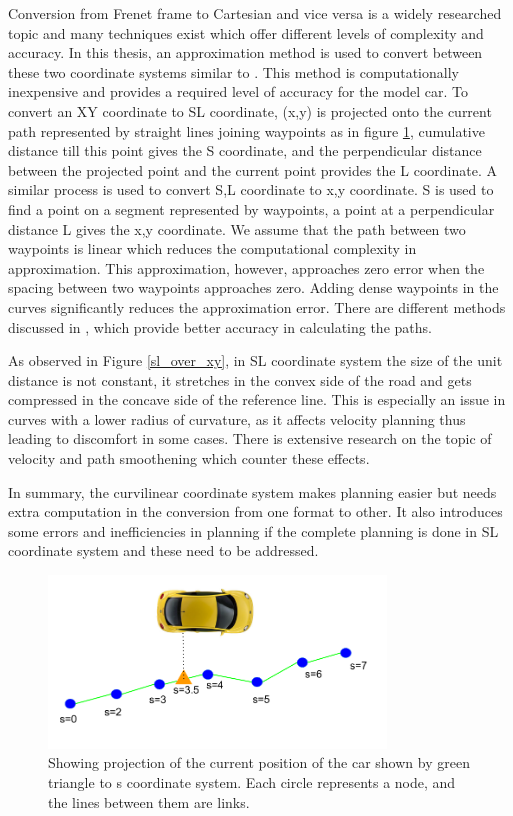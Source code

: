  Conversion from Frenet frame to Cartesian and vice versa is a widely researched topic and many techniques exist which offer different levels of complexity and accuracy. In this thesis, an approximation method is used to convert between these two coordinate systems similar to \cite{volvo_reactive_traj}. This method is computationally inexpensive and provides a required level of accuracy for the model car. To convert an XY coordinate to SL coordinate, (x,y) is projected onto the current path represented by straight lines joining waypoints as in figure \ref{xy_sl_conversion}, cumulative distance till this point gives the S coordinate, and the perpendicular distance between the projected point and the current point provides the L coordinate. A similar process is used to convert S,L coordinate to x,y coordinate. S is used to find a point on a segment represented by waypoints, a point at a perpendicular distance L gives the x,y coordinate. We assume that the path between two waypoints is linear which reduces the computational complexity in approximation. This approximation, however, approaches zero error when the spacing between two waypoints approaches zero. Adding dense waypoints in the curves significantly reduces the approximation error. There are different methods discussed in \cite{lengthparameterized}, \cite{Wangrobustand} which provide better accuracy in calculating the paths. 

As observed in Figure \ref{sl_over_xy}, in SL coordinate system the size of the unit distance is not constant, it stretches in the convex side of the road and gets compressed in the concave side of the reference line. This is especially an issue in curves with a lower radius of curvature, as it affects velocity planning thus leading to discomfort in some cases. There is extensive research on the topic of velocity and path smoothening which counter these effects. 

In summary, the curvilinear coordinate system makes planning easier but needs extra computation in the conversion from one format to other. It also introduces some errors and inefficiencies in planning if the complete planning is done in SL coordinate system and these need to be addressed. 
 
 \begin{figure}[H]
    \centering
    \includegraphics[width=0.8\textwidth]{Images/xy_sl_conversion.png}
    \caption{Showing projection of the current position of the car shown by green triangle to s coordinate system. Each circle represents a node, and the lines between them are links. \cite{volvo_reactive_traj}}
    \label{xy_sl_conversion}
\end{figure}

